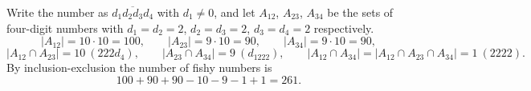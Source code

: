 Write the number as $\overline{d_1d_2d_3d_4}$ with $d_1\ne0$, and let $A_{12}$, $A_{23}$, $A_{34}$ be the sets of four-digit numbers with $d_1=d_2=2$, $d_2=d_3=2$, $d_3=d_4=2$ respectively.
\[|A_{12}|=10\cdot10=100,\qquad|A_{23}|=9\cdot10=90,\qquad|A_{34}|=9\cdot10=90,\]
\[|A_{12}\cap A_{23}|=10\ (222d_4),\qquad|A_{23}\cap A_{34}|=9\ (d_1222),\qquad|A_{12}\cap A_{34}|=|A_{12}\cap A_{23}\cap A_{34}|=1\ (2222).\]
By inclusion-exclusion the number of fishy numbers is
\[100+90+90-10-9-1+1=\boxed{261}.\]
